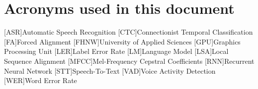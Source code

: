\section*{Acronyms used in this document}

\begin{acronym}[Bash]
	[ASR]{Automatic Speech Recognition}
	[CTC]{Connectionist Temporal Classification}
	[FA]{Forced Alignment}
	[FHNW]{University of Applied Sciences}
	[GPU]{Graphics Processing Unit}
	[LER]{Label Error Rate}
	[LM]{Language Model}
	[LSA]{Local Sequence Alignment}
	[MFCC]{Mel-Frequency Cepstral Coefficients}
	[RNN]{Recurrent Neural Network}
	[STT]{Speech-To-Text}
	[VAD]{Voice Activity Detection}
	[WER]{Word Error Rate}
\end{acronym}